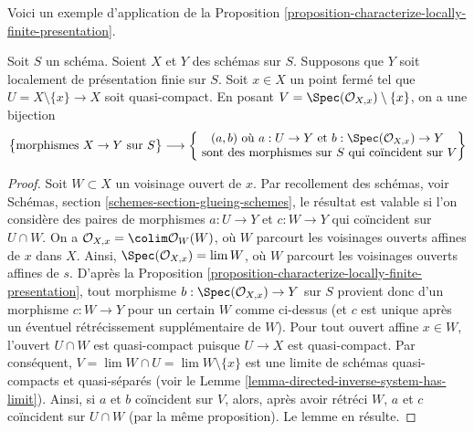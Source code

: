 \noindent
Voici un exemple d'application de la
Proposition \ref{proposition-characterize-locally-finite-presentation}.

\begin{lemma}
\label{lemma-morphism-glueing-near-closed-point}
Soit $S$ un schéma. Soient $X$ et $Y$ des schémas sur $S$. Supposons que
$Y$ soit localement de présentation finie sur $S$. Soit $x \in X$ un point
fermé tel que $U = X \setminus \{x\} \to X$ soit quasi-compact. En posant
$V = \Spec(\mathcal{O}_{X, x}) \setminus \{x\}$, on a une bijection
$$
\left\{
\begin{matrix}
\text{morphismes }X \to Y\text{ sur }S
\end{matrix}
\right\}
\longrightarrow
\left\{
\begin{matrix}
(a, b)\text{ où }
a : U \to Y\text{ et }b : \Spec(\mathcal{O}_{X, x}) \to Y\\
\text{ sont des morphismes sur }S
\text{ qui coïncident sur }V
\end{matrix}
\right\}
$$
\end{lemma}

\begin{proof}
Soit $W \subset X$ un voisinage ouvert de $x$. Par recollement des schémas,
voir Schémas, section \ref{schemes-section-glueing-schemes}, le résultat est
valable si l'on considère des paires de morphismes $a : U \to Y$ et
$c : W \to Y$ qui coïncident sur $U \cap W$. On a
$\mathcal{O}_{X, x} = \colim \mathcal{O}_W(W)$, où $W$ parcourt les
voisinages ouverts affines de $x$ dans $X$. Ainsi,
$\Spec(\mathcal{O}_{X, x}) = \lim W$, où $W$ parcourt les voisinages ouverts
affines de $s$. D'après la
Proposition \ref{proposition-characterize-locally-finite-presentation}, tout
morphisme $b : \Spec(\mathcal{O}_{X, x}) \to Y$ sur $S$ provient donc d'un
morphisme $c : W \to Y$ pour un certain $W$ comme ci-dessus (et $c$ est
unique après un éventuel rétrécissement supplémentaire de $W$). Pour tout
ouvert affine $x \in W$, l'ouvert $U \cap W$ est quasi-compact puisque
$U \to X$ est quasi-compact. Par conséquent,
$V = \lim W \cap U = \lim W \setminus \{x\}$ est une limite de schémas
quasi-compacts et quasi-séparés (voir le
Lemme \ref{lemma-directed-inverse-system-has-limit}). Ainsi, si $a$ et $b$
coïncident sur $V$, alors, après avoir rétréci $W$, $a$ et $c$ coïncident sur
$U \cap W$ (par la même proposition). Le lemme en résulte.
\end{proof}







